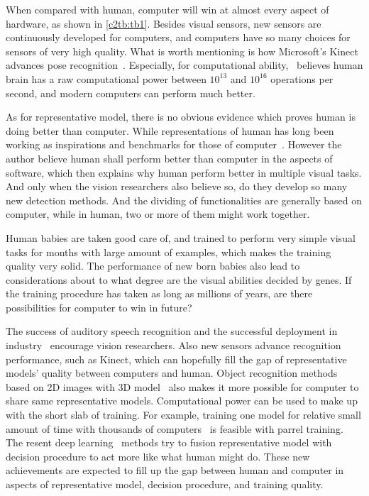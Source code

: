 When compared with human, computer will win at almost every aspect of hardware, as shown in \ref{c2tb:tb1}. Besides visual sensors, new sensors are continuously developed for computers, and computers have so many choices for sensors of very high quality. What is worth mentioning is how Microsoft's Kinect advances pose recognition~\cite{knct}. Especially, for computational ability,~\cite{bpw} believes human brain has a raw computational power between $10^{13}$ and $10^{16}$ operations per second, and modern computers can perform much better.

 As for representative model, there is no obvious evidence which proves human is doing better than computer. While representations of human has long been working as inspirations and benchmarks for those of computer~\cite{rbm}. However the author believe human shall perform better than computer in the aspects of software, which then explains why human perform better in multiple visual tasks. And only when the vision researchers also believe so, do they develop  so many new detection methods. And the  dividing of functionalities  are generally based on computer, while in human, two or more of them might work together.

Human babies are taken good care of, and trained to perform very simple visual tasks for months with large amount of examples, which makes the training quality very solid. The performance of new born babies also lead to considerations about to what degree are the visual abilities decided by genes. If the training procedure has taken as long as millions of years, are there possibilities for computer to win in future?

The success of auditory speech recognition and the successful deployment in industry~\cite{siri} encourage vision researchers. Also new sensors advance recognition performance, such as Kinect, which can hopefully fill the gap of representative models' quality between computers and human. Object recognition methods based on 2D images with 3D model~\cite{r3d} also makes it more possible for computer to share same representative models.  Computational power can be used to make up with the short slab of training. For example, training one model for relative small amount of time with thousands of computers~\cite{dnnnn} is feasible with parrel training. The resent deep learning~\cite{dlearn} methods try to fusion representative model with decision procedure to act more like what human might do. These new achievements are expected to fill up the gap between human and computer in aspects of representative model, decision procedure, and training quality.



